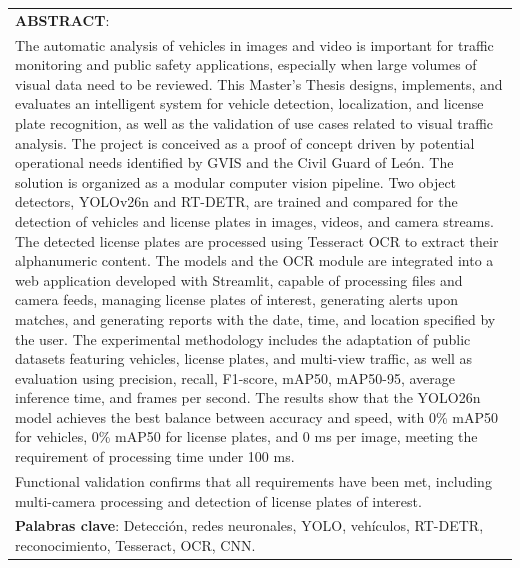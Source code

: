 \documentclass[12pt,a4paper,onecolumn,oneside]{report}
\begin{document}
\vspace{-1em}
\begin{longtable}{|p{16cm}|}    
    \textbf{ABSTRACT}:\\
    The automatic analysis of vehicles in images and video is important for traffic monitoring and public safety applications, especially when large volumes of visual data need to be reviewed. This Master's Thesis designs, implements, and evaluates an intelligent system for vehicle detection, localization, and license plate recognition, as well as the validation of use cases related to visual traffic analysis. The project is conceived as a proof of concept driven by potential operational needs identified by GVIS and the Civil Guard of León. The solution is organized as a modular computer vision pipeline. Two object detectors, YOLOv26n and RT-DETR, are trained and compared for the detection of vehicles and license plates in images, videos, and camera streams. The detected license plates are processed using Tesseract OCR to extract their alphanumeric content. The models and the OCR module are integrated into a web application developed with Streamlit, capable of processing files and camera feeds, managing license plates of interest, generating alerts upon matches, and generating reports with the date, time, and location specified by the user. The experimental methodology includes the adaptation of public datasets featuring vehicles, license plates, and multi-view traffic, as well as evaluation using precision, recall, F1-score, mAP50, mAP50-95, average inference time, and frames per second. The results show that the YOLO26n model achieves the best balance between accuracy and speed, with 0\% mAP50 for vehicles, 0\% mAP50 for license plates, and 0 ms per image, meeting the requirement of processing time under 100 ms.\\ Functional validation confirms that all requirements have been met, including multi-camera processing and detection of license plates of interest.\\%
    \hline
    \textbf{Palabras clave}: Detección, redes neuronales, YOLO, vehículos, RT-DETR, reconocimiento, Tesseract, OCR, CNN.\\
    \hline
\end{longtable}

\newpage
\pagestyle{plain}

\setcounter{page}{1} %


\tableofcontents

\listoffigures
\end{document}
